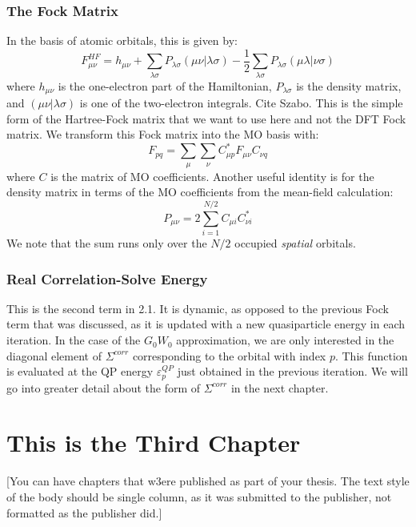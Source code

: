 \documentclass[12pt]{caltech_thesis}
\begin{document}
\subsection{The Fock Matrix}
In the basis of atomic orbitals, this is given by:
\begin{equation}
F_{\mu\nu}^{HF} = h_{\mu\nu} + \sum_{\lambda\sigma}P_{\lambda\sigma}(\mu\nu|\lambda\sigma) - \frac{1}{2}\sum_{\lambda\sigma}P_{\lambda\sigma}(\mu\lambda|\nu\sigma)
\end{equation}
where $h_{\mu\nu}$ is the one-electron part of the Hamiltonian, $P_{\lambda\sigma}$ is the density matrix, and $(\mu\nu|\lambda\sigma)$ is one of the two-electron integrals. Cite Szabo. This is the simple form of the Hartree-Fock matrix that we want to use here and not the DFT Fock matrix. We transform this Fock matrix into the MO basis with:
\begin{equation}
   F_{pq} = \sum_{\mu} \sum_{\nu} C_{\mu p}^{*}F_{\mu\nu}C_{\nu q}
\end{equation}
where $C$ is the matrix of MO coefficients. Another useful identity is for the density matrix in terms of the MO coefficients from the mean-field calculation: 
\begin{equation}
P_{\mu\nu} = 2\sum_{i=1}^{N/2}C_{\mu i}C_{\nu i}^{*}
\end{equation}
We note that the sum runs only over the $N/2$ occupied \emph{spatial} orbitals.
\subsection{Real Correlation-Solve Energy}
This is the second term in 2.1. It is dynamic, as opposed to the previous Fock term that was discussed, as it is updated with a new quasiparticle energy in each iteration. In the case of the $G_0W_0$ approximation, we are only interested in the diagonal element of $\Sigma^{corr}$ corresponding to the orbital with index $p$. This function is evaluated at the QP energy $\varepsilon_{p}^{QP}$ just obtained in the previous iteration. We will go into greater detail about the form of $\Sigma^{corr}$ in the next chapter.


\chapter{This is the Third Chapter}


[You can have chapters that w3ere published as part of your thesis. The text style of the body should be single column, as it was submitted to the publisher, not formatted as the publisher did.]
\end{document}
